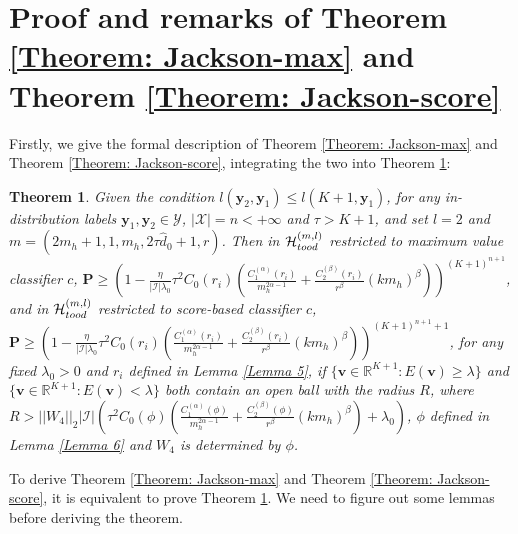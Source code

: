 \documentclass{article}
\theoremstyle{plain}
\newtheorem{theorem}{Theorem}[section]
\theoremstyle{definition}
\theoremstyle{remark}
\begin{document}
\section{Proof and remarks of Theorem \ref{Theorem: Jackson-max} and Theorem \ref{Theorem: Jackson-score}}
\label{appendix B}
Firstly, we give the formal description of Theorem \ref{Theorem: Jackson-max} and Theorem \ref{Theorem: Jackson-score}, integrating the two into Theorem \ref{Theorem: Jackson-type}:
\begin{theorem}
    Given the condition $l(\mathbf{y}_2, \mathbf{y}_1) \leq l(K + 1, \mathbf{y}_1)$, for any in-distribution labels $\mathbf{y}_1, \mathbf{y}_2 \in \mathcal{Y}$,  $|\mathcal{X}|=n<+\infty$ and  $\tau>K+1$, and set $l=2$ and $m=(2m_h+1,1,m_h,2\tau \hat{d}_0+1,r)$. Then in $\mathcal{H}_{\rm tood}^{(m,l)}$ restricted to maximum value classifier $c$, $\mathbf{P}\geq (1-\frac{\eta}{|\mathcal{I}|\lambda_0}\tau^2 C_0(r_i)(\frac{C_1^{(\alpha)}(r_i)}{m_h^{2\alpha-1}}+\frac{C_2^{(\beta )}(r_i)}{r^{\beta}}(km_h)^{\beta}))^{(K+1)^{n+1}}$, and in $\mathcal{H}_{\rm tood}^{(m,l)}$ restricted to score-based classifier $c$, $\mathbf{P}\geq (1-\frac{\eta}{|\mathcal{I}|\lambda_0}\tau^2 C_0(r_i)(\frac{C_1^{(\alpha)}(r_i)}{m_h^{2\alpha-1}}+\frac{C_2^{(\beta )}(r_i)}{r^{\beta}}(km_h)^{\beta}))^{(K+1)^{n+1}+1}$, for any fixed $\lambda_0>0$ and $r_i$ defined in Lemma \ref{Lemma 5}, if $\{\mathbf{v}\in \mathbb{R}^{K+1}:E(\mathbf{v})\geq \lambda\}$ and $\{\mathbf{v}\in \mathbb{R}^{K+1}:E(\mathbf{v})< \lambda\}$ both contain an open ball with the radius $R$, where $R>||W_4||_2|\mathcal{I}|(\tau^2 C_0(\phi)(\frac{C_1^{(\alpha)}(\phi)}{m_h^{2\alpha-1}}+\frac{C_2^{(\beta )}(\phi)}{r^{\beta}}(km_h)^{\beta})+\lambda_0)$, $\phi$ defined in Lemma \ref{Lemma 6} and $W_4$ is determined by $\phi$.
    \label{Theorem: Jackson-type}
\end{theorem}


To derive Theorem \ref{Theorem: Jackson-max} and Theorem \ref{Theorem: Jackson-score}, it is equivalent to prove Theorem \ref{Theorem: Jackson-type}. We need to figure out some lemmas before deriving the theorem.
\end{document}
